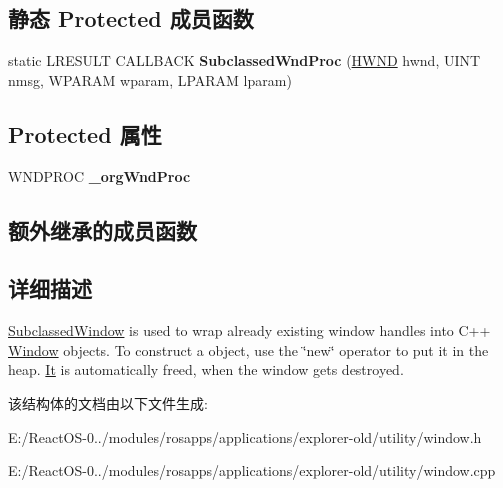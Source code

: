 \subsection*{静态 Protected 成员函数}
\begin{DoxyCompactItemize}
\item 
\mbox{\label{struct_subclassed_window_a5a00033437fc376beaa9b19416ffd3e0}} 
static L\+R\+E\+S\+U\+LT C\+A\+L\+L\+B\+A\+CK {\bfseries Subclassed\+Wnd\+Proc} (\hyperlink{interfacevoid}{H\+W\+ND} hwnd, U\+I\+NT nmsg, W\+P\+A\+R\+AM wparam, L\+P\+A\+R\+AM lparam)
\end{DoxyCompactItemize}
\subsection*{Protected 属性}
\begin{DoxyCompactItemize}
\item 
\mbox{\label{struct_subclassed_window_a2e694e14c1ae5db2c28b2c00bbc128c0}} 
W\+N\+D\+P\+R\+OC {\bfseries \+\_\+org\+Wnd\+Proc}
\end{DoxyCompactItemize}
\subsection*{额外继承的成员函数}


\subsection{详细描述}
\hyperlink{struct_subclassed_window}{Subclassed\+Window} is used to wrap already existing window handles into C++ \hyperlink{struct_window}{Window} objects. To construct a object, use the \char`\"{}new\char`\"{} operator to put it in the heap. \hyperlink{class_it}{It} is automatically freed, when the window gets destroyed. 

该结构体的文档由以下文件生成\+:\begin{DoxyCompactItemize}
\item 
E\+:/\+React\+O\+S-\/0../modules/rosapps/applications/explorer-\/old/utility/window.\+h\item 
E\+:/\+React\+O\+S-\/0../modules/rosapps/applications/explorer-\/old/utility/window.\+cpp\end{DoxyCompactItemize}

